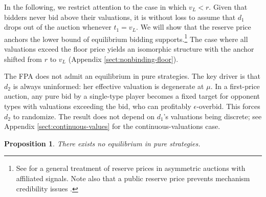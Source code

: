 \documentclass[11pt]{article}
\theoremstyle{plain}
\theoremstyle{definition}
\theoremstyle{plain}
\theoremstyle{plain}
\theoremstyle{plain}
\theoremstyle{plain}
\newtheorem{prop}[thm]{Proposition}
\numberwithin{equation}{section}
\begin{document}
\vspace{0.2cm}

\noindent In the following, we restrict attention to the case in which $v_L < r$. Given that bidders never bid above their valuations, it is without loss to assume that $d_1$ drops out of the auction whenever $t_1 = v_L$. We will show that the reserve price anchors the lower bound of equilibrium bidding supports.\footnote{See \textcite{lizzeriUniquenessExistenceEquilibrium2000} for a general treatment of reserve prices in asymmetric auctions with affiliated signals. Note also that a public reserve price prevents mechanism credibility issues \parencite{banchioDynamicThreatsCredible}.} The case where all valuations exceed the floor price yields an isomorphic structure with the anchor shifted from $r$ to $v_L$ (Appendix \ref{sect:nonbinding-floor}).


\vspace{0.2cm}

\noindent The FPA does not admit an equilibrium in pure strategies. The key driver is that $ d_2 $ is always uninformed: her effective valuation is degenerate at $ \mu $. In a first-price auction, any pure bid by a single-type player becomes a fixed target for opponent types with valuations exceeding the bid, who can profitably $ \epsilon $-overbid. This forces $ d_2 $ to randomize. The result does not depend on $ d_1 $'s valuations being discrete; see Appendix \ref{sect:continuous-values} for the continuous-valuations case.

\vspace{0.2cm}

\begin{prop}\label{prop:no-pure}
There exists no equilibrium in pure strategies.
\end{prop}

\vspace{0.1cm}
\end{document}
